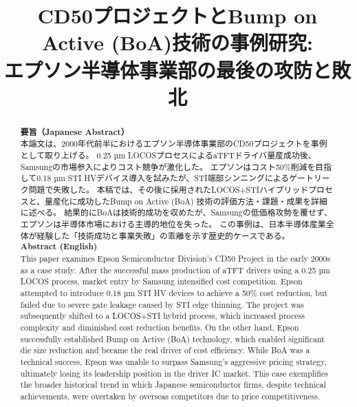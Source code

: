 \documentclass[conference]{IEEEtran}
\begin{document}
\title{CD50プロジェクトとBump on Active (BoA)技術の事例研究:\\
エプソン半導体事業部の最後の攻防と敗北}

\author{%
}

\maketitle

\begin{abstract}
\textbf{要旨（Japanese Abstract）} \\
本論文は、2000年代前半におけるエプソン半導体事業部のCD50プロジェクトを事例として取り上げる。
0.25 µm LOCOSプロセスによるaTFTドライバ量産成功後、Samsungの市場参入によりコスト競争が激化した。
エプソンはコスト50\%削減を目指して0.18 µm STI HVデバイス導入を試みたが、STI端部シンニングによるゲートリーク問題で失敗した。
本稿では、その後に採用されたLOCOS+STIハイブリッドプロセスと、量産化に成功したBump on Active (BoA) 技術の評価方法・課題・成果を詳細に述べる。
結果的にBoAは技術的成功を収めたが、Samsungの低価格攻勢を覆せず、エプソンは半導体市場における主導的地位を失った。
この事例は、日本半導体産業全体が経験した「技術成功と事業失敗」の乖離を示す歴史的ケースである。 \\[1em]

\textbf{Abstract (English)} \\
This paper examines Epson Semiconductor Division's CD50 Project in the early 2000s as a case study.
After the successful mass production of aTFT drivers using a 0.25 µm LOCOS process, market entry by Samsung intensified cost competition.
Epson attempted to introduce 0.18 µm STI HV devices to achieve a 50\% cost reduction, but failed due to severe gate leakage caused by STI edge thinning.
The project was subsequently shifted to a LOCOS+STI hybrid process, which increased process complexity and diminished cost reduction benefits.
On the other hand, Epson successfully established Bump on Active (BoA) technology, which enabled significant die size reduction and became the real driver of cost efficiency.
While BoA was a technical success, Epson was unable to surpass Samsung’s aggressive pricing strategy, ultimately losing its leadership position in the driver IC market.
This case exemplifies the broader historical trend in which Japanese semiconductor firms, despite technical achievements, were overtaken by overseas competitors due to price competitiveness.
\end{abstract}
\end{document}
